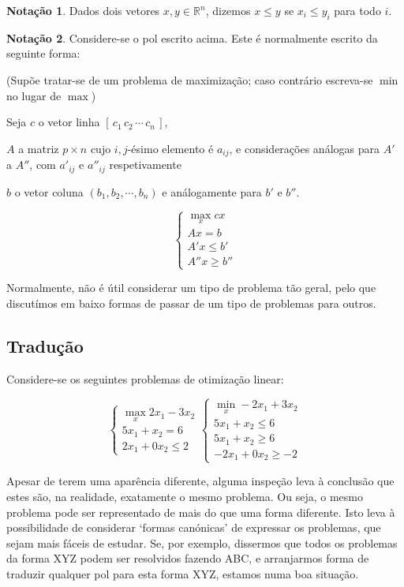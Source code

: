 \documentclass{article}
\newcommand{\R}{\mathbb{R}}
\theoremstyle{definition}
\newtheorem*{notacao}{Notação}
\begin{document}
	\begin{notacao}
Dados dois vetores $x,y \in \R^n$, dizemos $x \leq y$ se $x_i \leq y_i$ para todo $i$.
	\end{notacao}
	\begin{notacao}
	Considere-se o pol escrito acima. Este é normalmente escrito da seguinte forma:
	
	(Supõe tratar-se de um problema de maximização; caso contrário escreva-se $\min$ no lugar de $\max$)
	
	Seja $c$ o vetor linha $[\,c_1\,c_2\, \cdots \,c_n\,]$,

	$A$ a matriz $p \times n$ cujo $i,j$-ésimo elemento é $a_{ij}$, e considerações análogas para $A'$ a $A''$, com $a'_{ij}$ e $a''_{ij}$ respetivamente
	
	$b$ o vetor coluna $(b_1, b_2, \cdots, b_n)$ e análogamente para $b'$ e $b''$.
	
	\[
	\begin{cases}
	\max\limits_x cx \\
	Ax = b \\
	A'x \leq b' \\
	A''x \geq b''
	\end{cases}
	\]
	\end{notacao}
	
	Normalmente, não é útil considerar um tipo de problema tão geral, pelo que discutímos em baixo formas de passar de um tipo de problemas para outros.
	
	\subsection{Tradução}
	
	Considere-se os seguintes problemas de otimização linear:
	
	\[
	\begin{cases}
	\max\limits_x 2x_1 - 3x_2 \\
	5x_1 + x_2 = 6 \\
	2x_1 + 0x_2 \leq 2
	\end{cases}
	\begin{cases}
	\min\limits_x -2x_1 + 3x_2 \\
	5x_1 + x_2 \leq 6 \\
	5x_1 + x_2 \geq 6 \\
	-2x_1 + 0x_2 \geq -2
	\end{cases}
	\]
	
	Apesar de terem uma aparência diferente, alguma inspeção leva à conclusão que estes são, na realidade, exatamente o mesmo problema. Ou seja, o mesmo problema pode ser representado de mais do que uma forma diferente. Isto leva à possibilidade de considerar `formas canónicas' de expressar os problemas, que sejam mais fáceis de estudar. Se, por exemplo, dissermos que todos os problemas da forma XYZ podem ser resolvidos fazendo ABC, e arranjarmos forma de traduzir qualquer pol para esta forma XYZ, estamos numa boa situação.
	
\end{document}
